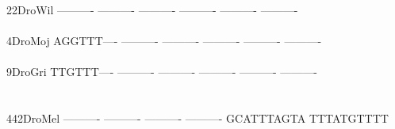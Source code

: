 \documentclass[11pt,twoside,reqno,a4paper]{article}
\begin{document}
{22\hspace*{3\charwidth}DroWil	----------	----------	----------	----------	----------	----------	\\
\hspace*{5\charwidth}\hspace*{7\charwidth}\hspace*{1\charwidth}\hspace*{1\charwidth}\hspace*{1\charwidth}\hspace*{1\charwidth}\hspace*{1\charwidth}\hspace*{1\charwidth}\\
4\hspace*{4\charwidth}DroMoj	AGGTTT----	----------	----------	----------	----------	----------	\\
\hspace*{5\charwidth}\hspace*{7\charwidth}\hspace*{1\charwidth}\hspace*{1\charwidth}\hspace*{1\charwidth}\hspace*{1\charwidth}\hspace*{1\charwidth}\hspace*{1\charwidth}\\
9\hspace*{4\charwidth}DroGri	TTGTTT----	----------	----------	----------	----------	----------	\\
\hspace*{5\charwidth}\hspace*{7\charwidth}\hspace*{1\charwidth}\hspace*{1\charwidth}\hspace*{1\charwidth}\hspace*{1\charwidth}\hspace*{1\charwidth}\hspace*{1\charwidth}\\
\\
442\hspace*{2\charwidth}DroMel	----------	----------	----------	----------	GCATTTAGTA	TTTATGTTTT	\\
\hspace*{5\charwidth}\hspace*{7\charwidth}\hspace*{1\charwidth}\hspace*{1\charwidth}\hspace*{1\charwidth}\hspace*{1\charwidth}\hspace*{1\charwidth}\hspace*{1\charwidth}\\
}
\end{document}
